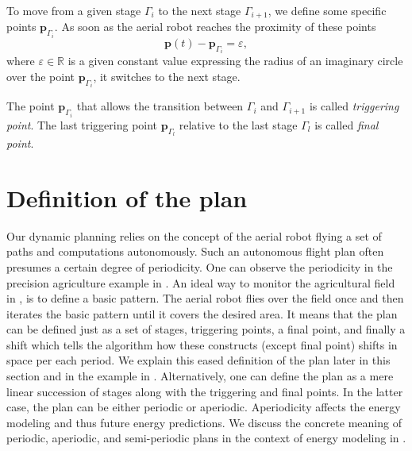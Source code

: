 To move from a given stage $\Gamma_i$ to the next stage $\Gamma_{i+1}$, we define some specific points $\mathbf{p}_{\Gamma_i}$. As soon as the aerial robot reaches the proximity of these points
\begin{equation}\label{eq:trig-vareps}
  \mathbf{p}(t)-\mathbf{p}_{\Gamma_i}=\varepsilon,
\end{equation}
where $\varepsilon\in\mathbb{R}$ is a given constant value expressing the radius of an imaginary circle over the point $\mathbf{p}_{\Gamma_i}$, it switches to the next stage.

\begin{highlight}  
  \begin{defn}\label{def:trigs}
    The point $\mathbf{p}_{\Gamma_{i}}$ that allows the transition between $\Gamma_i$ and $\Gamma_{i+1}$ is called \emph{triggering point}. The last triggering point $\mathbf{p}_{\Gamma_{l}}$ relative to the last stage $\Gamma_l$ is called \emph{final point}.
  \end{defn}
\end{highlight}


\section{Definition of the plan}
\label{sec:plan}

Our dynamic planning relies on the concept of the aerial robot flying a set of paths and computations autonomously. Such an autonomous flight plan often presumes a certain degree of periodicity. One can observe the periodicity in the precision agriculture example in . An ideal way to monitor the agricultural field in , is to define a basic pattern. The aerial robot flies over the field once and then iterates the basic pattern until it covers the desired area. It means that the plan can be defined just as a set of stages, triggering points, a final point, and finally a shift which tells the algorithm how these constructs (except final point) shifts in space per each period. We explain this eased definition of the plan later in this section and in the example in  . Alternatively, one can define the plan as a mere linear succession of stages along with the triggering and final points. In the latter case, the plan can be either periodic or aperiodic. Aperiodicity affects the energy modeling and thus future energy predictions. We discuss the concrete meaning of periodic, aperiodic, and semi-periodic plans in the context of energy modeling in .

